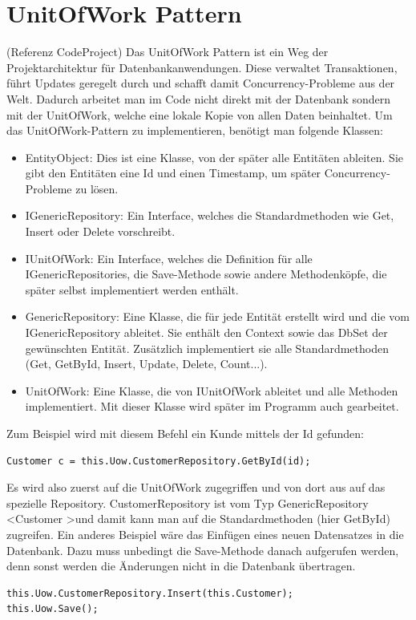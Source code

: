 \section{UnitOfWork Pattern}
(Referenz CodeProject)
Das UnitOfWork Pattern ist ein Weg der Projektarchitektur für Datenbankanwendungen. Diese verwaltet Transaktionen, führt Updates geregelt durch und schafft damit Concurrency-Probleme aus der Welt. Dadurch arbeitet man im Code nicht direkt mit der Datenbank sondern mit der UnitOfWork, welche eine lokale Kopie von allen Daten beinhaltet.
Um das UnitOfWork-Pattern zu implementieren, benötigt man folgende Klassen:
\begin{itemize}
\item EntityObject: Dies ist eine Klasse, von der später alle Entitäten ableiten. Sie gibt den Entitäten eine Id und einen Timestamp, um später Concurrency-Probleme zu lösen.
\item IGenericRepository: Ein Interface, welches die Standardmethoden wie Get, Insert oder Delete vorschreibt.
\item IUnitOfWork: Ein Interface, welches die Definition für alle IGenericRepositories, die Save-Methode sowie andere Methodenköpfe, die später selbst implementiert werden enthält.
\item GenericRepository: Eine Klasse, die für jede Entität erstellt wird und die vom IGenericRepository ableitet. Sie enthält den Context sowie das DbSet der gewünschten Entität. Zusätzlich implementiert sie alle Standardmethoden (Get, GetById, Insert, Update, Delete, Count...).
\item UnitOfWork: Eine Klasse, die von IUnitOfWork ableitet und alle Methoden implementiert. Mit dieser Klasse wird später im Programm auch gearbeitet. 
\end{itemize}
Zum Beispiel wird mit diesem Befehl ein Kunde mittels der Id gefunden:
\begin{lstlisting}
Customer c = this.Uow.CustomerRepository.GetById(id);
\end{lstlisting}
Es wird also zuerst auf die UnitOfWork zugegriffen und von dort aus auf das spezielle Repository. CustomerRepository ist vom Typ GenericRepository \textless Customer  \textgreater und damit kann man auf die Standardmethoden (hier GetById) zugreifen.
\newline
Ein anderes Beispiel wäre das Einfügen eines neuen Datensatzes in die Datenbank. Dazu muss unbedingt die Save-Methode danach aufgerufen werden, denn sonst werden die Änderungen nicht in die Datenbank übertragen.
\begin{lstlisting}
this.Uow.CustomerRepository.Insert(this.Customer);
this.Uow.Save();
\end{lstlisting}
